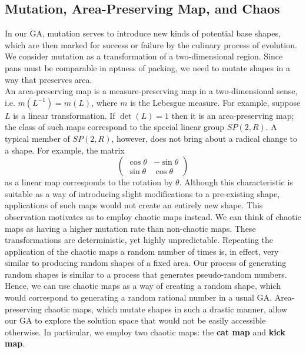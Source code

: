 \documentclass[12pt]{reedmcm}
\begin{document}
\subsection{Mutation, Area-Preserving Map, and Chaos}
In our GA, mutation serves to introduce new kinds of potential base shapes, which are then marked for success or failure by the culinary process of evolution.
We consider mutation as a transformation of a two-dimensional region.
Since pans must be comparable in aptness of packing, we need to mutate shapes in a way that preserves area.\\
An area-preserving map is a measure-preserving map in a two-dimensional sense, i.e. $m(L^{-1}) = m(L)$, where $m$ is the Lebesgue measure.
For example, suppose $L$ is a linear transformation.
If $\det(L) = 1$ then it is an area-preserving map; the class of such maps correspond to the special linear group $SP(2,R)$.
A typical member of $SP(2,R)$, however, does not bring about a radical change to a shape.
For example, the matrix
\begin{equation*}
\begin{pmatrix}
    \cos\theta & -\sin\theta  \\
    \sin\theta & \cos\theta  
  \end{pmatrix}
\end{equation*}
as a linear map corresponds to the rotation by $\theta$. 
Although this characteristic is suitable as a way of introducing slight modifications to a pre-existing shape, applications of such maps would not create an entirely new shape.
This observation motivates us to employ chaotic maps instead.
We can think of chaotic maps as having a higher mutation rate than non-chaotic maps.
These transformations are deterministic, yet highly unpredictable.
Repeating the application of the chaotic maps a random number of times is, in effect, very similar to producing random shapes of a fixed area. 
Our process of generating random shapes is similar to a process that generates pseudo-random numbers.
Hence, we can use chaotic maps as a way of creating a random shape, which would correspond to generating a random rational number in a usual GA.
Area-preserving chaotic maps, which mutate shapes in such a drastic manner, allow our GA to explore the solution space that would not be easily accessible otherwise.
In particular, we employ two chaotic maps: the \textbf{cat map} and \textbf{kick map}.
\end{document}
